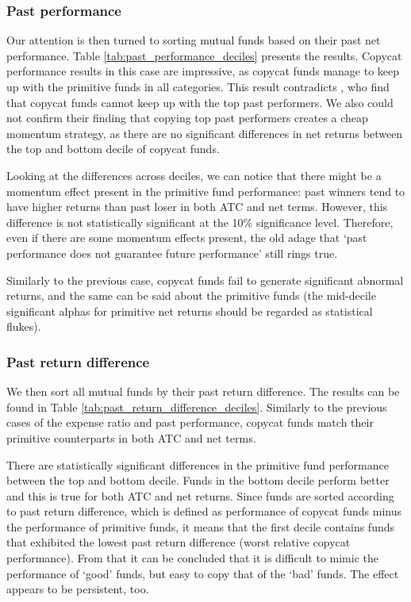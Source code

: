 \documentclass[12pt, a4]{article}
\begin{document}
\subsubsection{Past performance}
Our attention is then turned to sorting mutual funds based on their past net performance. Table \ref{tab:past_performance_deciles} presents the results. Copycat performance results in this case are impressive, as copycat funds manage to keep up with the primitive funds in all categories. This result contradicts \cite{verbeek}, who find that copycat funds cannot keep up with the top past performers. We also could not confirm their finding that copying top past performers creates a cheap momentum strategy, as there are no significant differences in net returns between the top and bottom decile of copycat funds.

Looking at the differences across deciles, we can notice that there might be a momentum effect present in the primitive fund performance: past winners tend to have higher returns than past loser in both \textsc{ATC} and net terms. However, this difference is not statistically significant at the 10\% significance level. Therefore, even if there are some momentum effects present, the old adage that `past performance does not guarantee future performance' still rings true.

Similarly to the previous case, copycat funds fail to generate significant abnormal returns, and the same can be said about the primitive funds (the mid-decile significant alphas for primitive net returns should be regarded as statistical flukes).


\subsubsection{Past return difference}

We then sort all mutual funds by their past return difference. The results can be found in Table \ref{tab:past_return_difference_deciles}. Similarly to the previous cases of the expense ratio and past performance, copycat funds match their primitive counterparts in both \textsc{ATC} and net terms.

There are statistically significant differences in the primitive fund performance between the top and bottom decile. Funds in the bottom decile perform better and this is true for both \textsc{ATC} and net returns. Since funds are sorted according to past return difference, which is defined as performance of copycat funds minus the performance of primitive funds, it means that the first decile contains funds that exhibited the lowest past return difference (worst relative copycat performance). From that it can be concluded that it is difficult to mimic the performance of `good' funds, but easy to copy that of the `bad' funds. The effect appears to be persistent, too.
\end{document}
